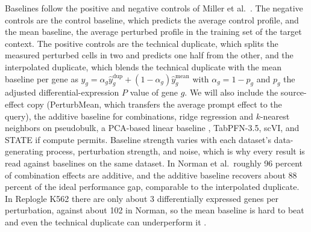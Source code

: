 \documentclass[times, twoside, watermark]{zHenriquesLab-StyleBioRxiv}
\begin{document}
Baselines follow the positive and negative controls of Miller et al.\ \cite{miller2026calibrated}. The negative controls are the control baseline, which predicts the average control profile, and the mean baseline, the average perturbed profile in the training set of the target context. The positive controls are the technical duplicate, which splits the measured perturbed cells in two and predicts one half from the other, and the interpolated duplicate, which blends the technical duplicate with the mean baseline per gene as $\hat{y}_g=\alpha_g\hat{y}^{\mathrm{dup}}_g+(1-\alpha_g)\hat{y}^{\mathrm{mean}}_g$ with $\alpha_g=1-p_g$ and $p_g$ the adjusted differential-expression $P$ value of gene $g$. We will also include the source-effect copy (PerturbMean, which transfers the average prompt effect to the query), the additive baseline for combinations, ridge regression and $k$-nearest neighbors on pseudobulk, a PCA-based linear baseline \cite{ahlmann2025linear}, TabPFN-3.5, scVI, and STATE if compute permits. Baseline strength varies with each dataset's data-generating process, perturbation strength, and noise, which is why every result is read against baselines on the same dataset. In Norman et al.\ roughly 96 percent of combination effects are additive, and the additive baseline recovers about 88 percent of the ideal performance gap, comparable to the interpolated duplicate. In Replogle K562 there are only about 3 differentially expressed genes per perturbation, against about 102 in Norman, so the mean baseline is hard to beat and even the technical duplicate can underperform it \cite{miller2026calibrated}.
\end{document}
